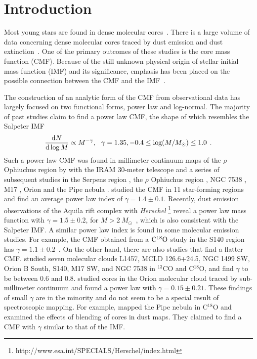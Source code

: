 \documentclass[12pt,preprint]{aastex}
\def\lp{\>\> .}
\begin{document}


\section{Introduction}

Most young stars are found in dense molecular cores~\citep{McKee2007}. There is a
large volume of data concerning dense molecular cores traced by dust
emission and dust extinction~\citep{Motte1998,Testi1998,Johnstone2000,Stanke2006,Reid2005,Reid2006,Johnstone2001,Johnstone2006,DCMF_Alves_Lombardi_Lada}.
One of the primary outcomes of these
studies is the core mass function (CMF). Because of the still
unknown physical origin of stellar initial mass function (IMF) and
its significance, emphasis has been placed on the possible
connection between the CMF and the IMF~\citep{DCMF_Alves_Lombardi_Lada}.

The construction of an analytic form of the CMF from observational data has
largely focused on two functional forms, power law and log-normal. The
majority of past studies claim to find a power law CMF, the shape of
which resembles the Salpeter IMF~\citep{IMF}
\begin{equation}
\frac{{\rm d}N}{{\rm d}\log M} \propto M^{-\gamma},\ \ \gamma=1.35, -0.4\le\log(M/M_{\odot})\le 1.0 \lp
\label{power_law}
\end{equation}
Such a power law CMF was found in millimeter continuum maps of the
$\rho$ Ophiuchus region by \cite{Motte1998} with the IRAM 30-meter
telescope and a series of subsequent studies in the Serpens region
\citep{Testi1998}, the $\rho$ Ophiuchus region
\citep{Johnstone2000,Stanke2006}, NGC 7538 \citep{Reid2005}, M17
\citep{Reid2006}, Orion \citep{Johnstone2001,Johnstone2006} and the
Pipe nebula \citep{DCMF_Alves_Lombardi_Lada}. \cite{Reid2006b}
studied the CMF in 11 star-forming regions and find an average power
law index of $\gamma=1.4\pm 0.1$. Recently, dust emission
observations of the Aquila rift complex with {\it Herschel}
\footnote{http://www.esa.int/SPECIALS/Herschel/index.html} reveal a power law
mass function with $\gamma=1.5\pm0.2$,
for $M>2\ M_{\odot}$~\citep{Aquila_cores}, which is also
consistent with the Salpeter IMF. A similar power law index is found
in some molecular emission studies. For example, the CMF obtained from a
$\rm C^{18}O$ study in the S140 region has $\gamma=1.1\pm
0.2$~\citep{S140}. On the other hand, there are also studies that
find a flatter CMF. \cite{Kramer1998} studied seven molecular clouds
L1457, MCLD 126.6+24.5, NGC 1499 SW, Orion B South, S140, M17 SW,
and NGC 7538 in $^{13}$CO and C$^{18}$O, and find $\gamma$ to be
between 0.6 and 0.8. \cite{core_mass_function} studied cores
in the Orion molecular cloud traced by sub-millimeter continuum and
found a power law with $\gamma=0.15\pm 0.21$. These findings of
small $\gamma$ are in the minority and do not seem to be a special result of
spectroscopic mapping. For example, \cite{Pipe_nebula_improve}
mapped the Pipe nebula in C$^{18}$O and examined the effects of
blending of cores in dust maps. They claimed to find a CMF with
$\gamma$ similar to that of the IMF.
\end{document}
